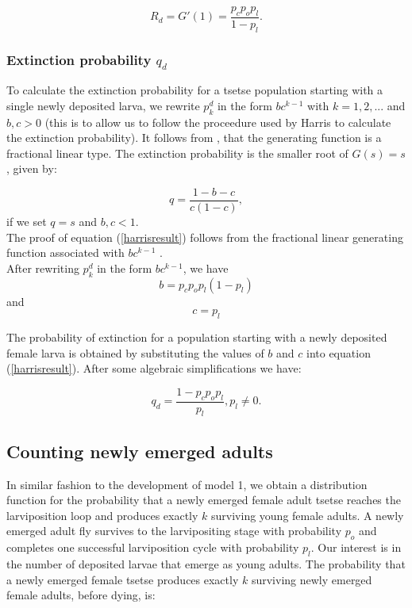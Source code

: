 \documentclass[smallextended]{svjour3}
\begin{document}
\begin{equation}
\label{larvareproductiveNum}
R_{d} = G'(1) = \frac{p_{c}p_{o}p_{l}}{1-p_{l}}.
\end{equation}  



\subsubsection{Extinction probability  $q_{d}$}

To calculate the extinction probability for a tsetse population starting with a single newly deposited larva, we rewrite $p_{k}^{d}$ in the form $bc^{k-1}$ with $k =1,2,...$ and $b,c > 0$ (this is to allow us to follow the proceedure used by Harris \cite{Harris1965} to calculate the extinction probability). It follows from  \cite{Harris1965}, that the generating function is a fractional linear type. The extinction probability is the smaller root of $G(s)=s$, given by: 

\begin{equation}
\label{harrisresult}
q = \frac{1 - b -c}{c(1-c)},
\end{equation}
if we set $q = s$ and  $b, c < 1$.\\

The proof of equation (\ref{harrisresult}) follows from the fractional linear generating function associated with $bc^{k-1}$ \cite{Harris1965}. \\

After rewriting $p_{k}^{d}$ in the form $bc^{k-1}$, we have  $$b = p_{c}p_{o}p_{l}(1-p_{l})$$ and $$c = p_{l}$$ 

The probability of extinction for a population starting with a newly deposited  female larva is obtained by substituting the values of $b$ and $c$ into equation (\ref{harrisresult}). After some algebraic simplifications we have:

\begin{equation}
\label{extictionLarva}
q_{d} = \frac{1-p_{c}p_{o}p_{l}}{p_{l}}, p_{l} \neq 0.
\end{equation}

\subsection{Counting newly emerged adults}

In similar fashion to the development of model 1, we obtain a distribution function for the probability that a newly emerged female adult tsetse reaches the larviposition loop and produces exactly $k$ surviving young female adults.
A newly emerged adult fly survives to the larvipositing stage  with probability $p_{o}$  and  completes one successful larviposition cycle with probability $p_{l}$. Our interest is in the number of deposited larvae that emerge as young adults. The probability that a newly emerged female tsetse produces exactly $k$ surviving newly emerged female adults, before dying, is: 
\end{document}
